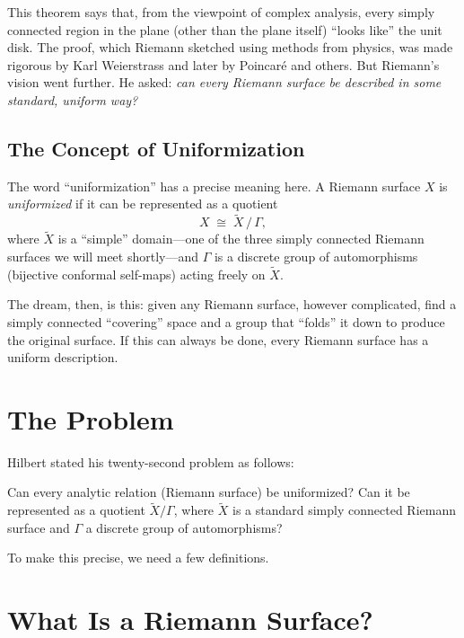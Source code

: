 This theorem says that, from the viewpoint of complex analysis, every simply connected region in the plane (other than the plane itself) ``looks like'' the unit disk. The proof, which Riemann sketched using methods from physics, was made rigorous by Karl Weierstrass and later by Poincar\'e and others. But Riemann's vision went further. He asked: \emph{can every Riemann surface be described in some standard, uniform way?}

\subsection{The Concept of Uniformization}

The word ``uniformization'' has a precise meaning here. A Riemann surface $X$ is \emph{uniformized} if it can be represented as a quotient
\[
    X \;\cong\; \widetilde{X}\, /\, \Gamma,
\]
where $\widetilde{X}$ is a ``simple'' domain---one of the three simply connected Riemann surfaces we will meet shortly---and $\Gamma$ is a discrete group of automorphisms (bijective conformal self-maps) acting freely on $\widetilde{X}$.

The dream, then, is this: given any Riemann surface, however complicated, find a simply connected ``covering'' space and a group that ``folds'' it down to produce the original surface. If this can always be done, every Riemann surface has a uniform description.

\section{The Problem}

Hilbert stated his twenty-second problem as follows:

\begin{problem_statement}
Can every analytic relation (Riemann surface) be uniformized? Can it be represented as a quotient $\widetilde{X}/\Gamma$, where $\widetilde{X}$ is a standard simply connected Riemann surface and $\Gamma$ a discrete group of automorphisms?
\end{problem_statement}

To make this precise, we need a few definitions.

\section{What Is a Riemann Surface?}

